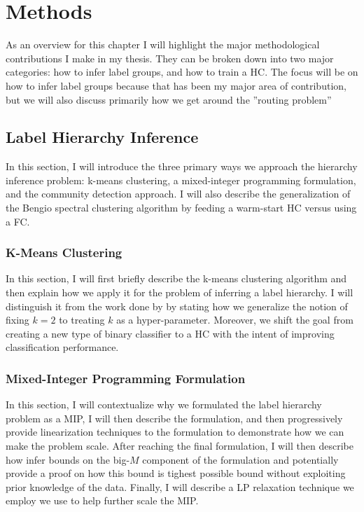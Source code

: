 \documentclass[../thesis.tex]{subfiles}
\begin{document}
\chapter{Methods}
As an overview for this chapter I will highlight the major methodological contributions I make in my thesis. They can be broken down into two major categories: how to infer label groups, and how to train a HC. The focus will be on how to infer label groups because that has been my major area of contribution, but we will also discuss primarily how we get around the ''routing problem''

\section{Label Hierarchy Inference}
In this section, I will introduce the three primary ways we approach the hierarchy inference problem: k-means clustering, a mixed-integer programming formulation, and the community detection approach. I will also describe the generalization of the Bengio spectral clustering algorithm by feeding a warm-start HC versus using a FC.

\subsection{K-Means Clustering}
In this section, I will first briefly describe the k-means clustering algorithm and then explain how we apply it for the problem of inferring a label hierarchy. I will distinguish it from the work done by \cite{vural2004hierarchical} by stating how we generalize the notion of fixing $k=2$ to treating $k$ as a hyper-parameter. Moreover, we shift the goal from creating a new type of binary classifier to a HC with the intent of improving classification performance.

\subsection{Mixed-Integer Programming Formulation}
In this section, I will contextualize why we formulated the label hierarchy problem as a MIP, I will then describe the formulation, and then progressively provide linearization techniques to the formulation to demonstrate how we can make the problem scale. After reaching the final formulation, I will then describe how infer bounds on the big-$M$ component of the formulation and potentially provide a proof on how this bound is tighest possible bound without exploiting prior knowledge of the data. Finally, I will describe a LP relaxation technique we employ we use to help further scale the MIP.
\end{document}
